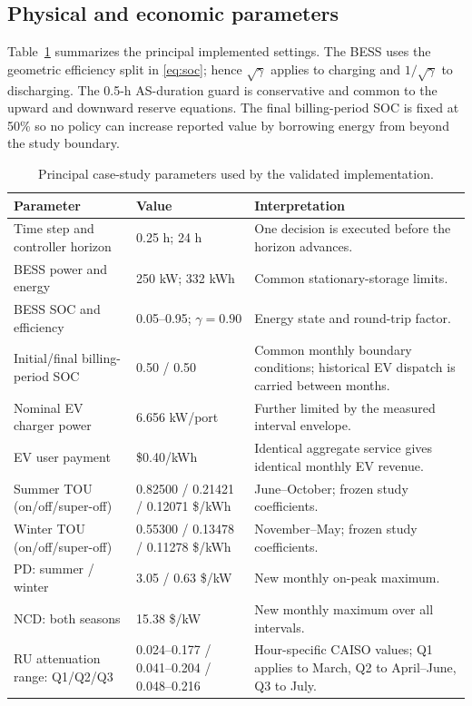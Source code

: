 \documentclass[final,5p,times]{elsarticle}
\begin{document}
\subsection{Physical and economic parameters}
Table~\ref{tab:case_parameters} summarizes the principal implemented settings. The BESS uses the geometric efficiency split in \eqref{eq:soc}; hence $\sqrt{\gamma}$ applies to charging and $1/\sqrt{\gamma}$ to discharging. The 0.5-h AS-duration guard is conservative and common to the upward and downward reserve equations. The final billing-period SOC is fixed at 50\% so no policy can increase reported value by borrowing energy from beyond the study boundary.

\begin{table}[!t]
\centering
\caption{Principal case-study parameters used by the validated implementation.}
\label{tab:case_parameters}
\small
\begin{tabularx}{\textwidth}{@{}p{}p{}X@{}}
\toprule
Parameter & Value & Interpretation \\
\midrule
Time step and controller horizon & 0.25 h; 24 h & One decision is executed before the horizon advances. \\
BESS power and energy & 250 kW; 332 kWh & Common stationary-storage limits. \\
BESS SOC and efficiency & 0.05--0.95; $\gamma=0.90$ & Energy state and round-trip factor. \\
Initial/final billing-period SOC & 0.50 / 0.50 & Common monthly boundary conditions; historical EV dispatch is carried between months. \\
Nominal EV charger power & 6.656 kW/port & Further limited by the measured interval envelope. \\
EV user payment & \$0.40/kWh & Identical aggregate service gives identical monthly EV revenue. \\
Summer TOU (on/off/super-off) & 0.82500 / 0.21421 / 0.12071 \$/kWh & June--October; frozen study coefficients. \\
Winter TOU (on/off/super-off) & 0.55300 / 0.13478 / 0.11278 \$/kWh & November--May; frozen study coefficients. \\
PD: summer / winter & 3.05 / 0.63 \$/kW & New monthly on-peak maximum. \\
NCD: both seasons & 15.38 \$/kW & New monthly maximum over all intervals. \\
RU attenuation range: Q1/Q2/Q3 & 0.024--0.177 / 0.041--0.204 / 0.048--0.216 & Hour-specific CAISO values; Q1 applies to March, Q2 to April--June, Q3 to July. \\

\end{tabularx}
\end{table}
\end{document}
